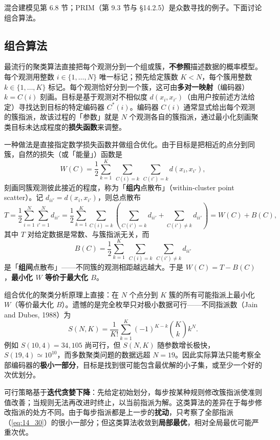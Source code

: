混合建模见第 6.8 节；PRIM（第 9.3 节与 §14.2.5）是众数寻找的例子。下面讨论组合算法。

\subsection{组合算法}

最流行的聚类算法直接把每个观测分到一个组或簇，\textbf{不参照}描述数据的概率模型。每个观测用整数 $i\in\{1,\dots,N\}$ 唯一标记；预先给定簇数 $K<N$，每个簇用整数 $k\in\{1,\dots,K\}$ 标记。每个观测恰好分到一个簇，这可由\textbf{多对一映射}（编码器）$k=C(i)$ 刻画。目标是基于观测对不相似度 $d(x_i,x_{i'})$（由用户按前述方法给定）寻找达到目标的特定编码器 $C^*(i)$。编码器 $C(i)$ 通常显式给出每个观测的簇指派，故该过程的「参数」就是 $N$ 个观测各自的簇指派，通过最小化刻画聚类目标未达成程度的\textbf{损失函数}来调整。

一种做法是直接指定数学损失函数并做组合优化。由于目标是把相近的点分到同簇，自然的损失（或「能量」）函数是
\begin{equation}
W(C) = \frac12\sum_{k=1}^{K}\ \sum_{C(i)=k}\ \sum_{C(i')=k} d(x_i,x_{i'}), \label{eq:14_28}
\end{equation}
刻画同簇观测彼此接近的程度，称为「\textbf{组内}点散布」（within-cluster point scatter）。记 $d_{ii'}=d(x_i,x_{i'})$，则总点散布
\[
T = \frac12\sum_{i=1}^{N}\sum_{i'=1}^{N} d_{ii'}
= \frac12\sum_{k=1}^{K}\sum_{C(i)=k}\left(\sum_{C(i')=k}d_{ii'} + \sum_{C(i')\ne k} d_{ii'}\right)
= W(C) + B(C),
\]
其中 $T$ 对给定数据是常数、与簇指派无关，而
\begin{equation}
B(C) = \frac12\sum_{k=1}^{K}\ \sum_{C(i)=k}\ \sum_{C(i')\ne k} d_{ii'} \label{eq:14_29}
\end{equation}
是「\textbf{组间}点散布」——不同簇的观测相距越远越大。于是 $W(C)=T-B(C)$，\textbf{最小化 $W$ 等价于最大化 $B$}。

组合优化的聚类分析原理上直接：在 $N$ 个点分到 $K$ 簇的所有可能指派上最小化 $W$（等价最大化 $B$）。遗憾的是完全枚举只对极小数据可行——不同指派数（Jain and Dubes, 1988）为
\begin{equation}
S(N,K) = \frac{1}{K!}\sum_{k=1}^{K}(-1)^{K-k}\binom{K}{k} k^N. \label{eq:14_30}
\end{equation}
例如 $S(10,4)=34{,}105$ 尚可行，但 $S(N,K)$ 随参数增长极快，$S(19,4)\simeq 10^{10}$，而多数聚类问题的数据远超 $N=19$。因此实际算法只能考察全部编码器的\textbf{极小一部分}，目标是找到很可能包含最优解的小子集，或至少一个好的次优划分。

可行策略基于\textbf{迭代贪婪下降}：先给定初始划分，每步按某种规则修改簇指派使准则值改善；当规则无法再改进时终止，以当前指派为解。这类算法的差异在于每步修改指派的处方不同。由于每步指派都是上一步的\textbf{扰动}，只考察了全部指派（\eqref{eq:14_30}）的很小一部分；但这类算法收敛到\textbf{局部最优}，相对全局最优可能严重次优。

